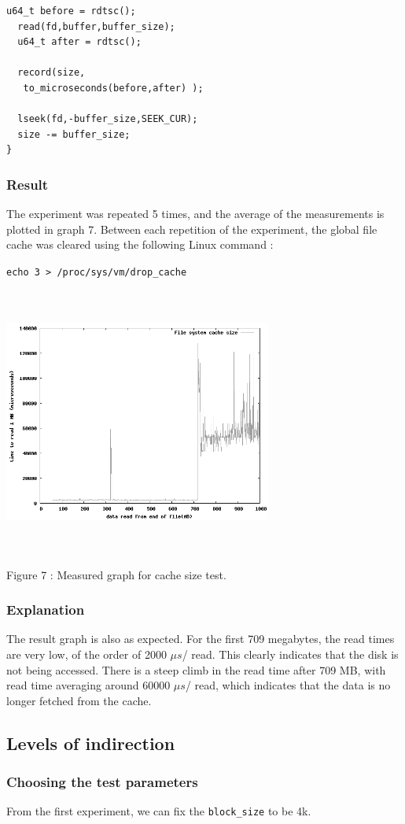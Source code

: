 \documentclass[twocolumn,11pt]{article}
\newcommand{\chumma}[1]{\subsubsection {#1}}
\newcommand{\mus}{$\mu s$}
\begin{document}
\begin{sloppypar}
\begin{lstlisting}[frame=single]
  u64_t before = rdtsc();
  read(fd,buffer,buffer_size);
  u64_t after = rdtsc();

  record(size,
   to_microseconds(before,after) );

  lseek(fd,-buffer_size,SEEK_CUR);
  size -= buffer_size;
}
\end{lstlisting}

\chumma{Result}

The experiment was repeated 5 times, and the average of the
measurements is plotted in graph 7. Between each repetition of
the experiment, the global file cache was cleared using the
following Linux command \cite{drop_cache}:

{\tt echo 3 > /proc/sys/vm/drop\_cache}

\includegraphics[width=250pt,height=250pt]{cache_size.png}
\begin{center}
Figure 7 : Measured graph for cache size test.
\end{center}

\chumma{Explanation}

The result graph is also as expected. For the first 709 megabytes,
the read times are very low, of the order of 2000 \mus / read. This
clearly indicates that the disk is not being accessed. There is a
steep climb in the read time after 709 MB, with read time averaging
around 60000 \mus / read, which indicates that the data is no longer
fetched from the cache.

\subsection{Levels of indirection}

\chumma{Choosing the test parameters}
From the first experiment, we can fix the {\tt block\_size} to be 4k.


\end{sloppypar}
\end{document}
